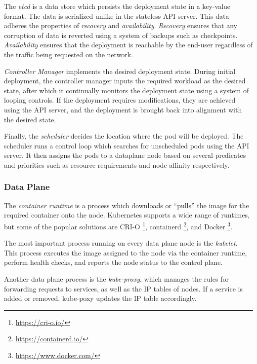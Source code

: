 The \textit{etcd} is a data store which persists the deployment state in a key-value format. The data is serialized unlike in the stateless API server. This data adheres the properties of \textit{recovery} and \textit{availability}. \textit{Recovery} ensures that any corruption of data is reverted using a system of backups such as checkpoints. \textit{Availability} ensures that the deployment is reachable by the end-user regardless of the traffic being requested on the network.\par

\textit{Controller Manager} implements the desired deployment state. During initial deployment, the controller manager inputs the required workload as the desired state, after which it continually monitors the deployment state using a system of looping controls. If the deployment requires modifications, they are achieved using the API server, and the deployment is brought back into alignment with the desired state.\par

Finally, the \textit{scheduler} decides the location where the pod will be deployed. The scheduler runs a control loop which searches for unscheduled pods using the API server. It then assigns the pods to a dataplane node based on several predicates and priorities such as resource requirements and node affinity respectively.

\subsubsection{Data Plane}
\label{subsubsec:ch2-k8s-data-plane}

The \textit{container runtime} is a process which downloads or ``pulls'' the image for the required container onto the node. Kubernetes supports a wide range of runtimes, but some of the popular solutions are CRI-O \footnote{\url{https://cri-o.io/}}, containerd \footnote{\url{https://containerd.io/}}, and Docker \footnote{\url{https://www.docker.com/}}.\par

The most important process running on every data plane node is the \textit{kubelet}. This process executes the image assigned to the node via the container runtime, perform health checks, and reports the node status to the control plane.\par

Another data plane process is the \textit{kube-proxy}, which manages the rules for forwarding requests to services, as well as the IP tables of nodes. If a service is added or removed, kube-poxy updates the IP table accordingly.\par

